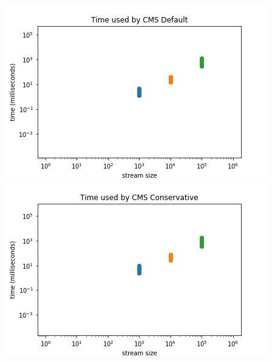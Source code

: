 \documentclass[a4paper, 11pt]{article}
\begin{document}
        \begin{center}
            \includegraphics[scale=0.5]{time_default}
            \includegraphics[scale=0.5]{time_conservative}
        \end{center}
\end{document}
